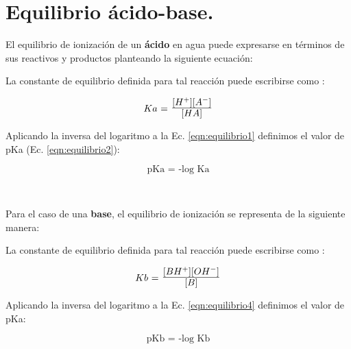 \documentclass[12pt,a4paper]{article}
\begin{document}
\section{Equilibrio ácido-base.}
	
	El equilibrio de ionización de un \textbf{ácido} en agua puede expresarse en términos de sus reactivos y productos planteando la siguiente ecuación:

	\begin{center}
	
		\setlength{\fboxsep}{10pt}

		\end{center}


	La constante de equilibrio definida para tal reacción puede escribirse como :
		
		\begin{equation}
			\mbox{$Ka$ = \Large $\frac{[H^+][A^-]}{[HA]}$}
			\label{eqn:equilibrio1}
		\end{equation}

	

	Aplicando la inversa del logaritmo a la Ec. \ref{eqn:equilibrio1} definimos el valor de pKa (Ec. \ref{eqn:equilibrio2}):

		\begin{equation}
			\mbox{pKa = -log Ka}
			\label{eqn:equilibrio2}
		\end{equation}
	
	~
		
	Para el caso de una \textbf{base}, el equilibrio de ionización se representa de la siguiente manera:
	
		\begin{center}

			\setlength{\fboxsep}{10pt}
			\label{eqn:equilibrio3}
		\end{center}
		
		
		La constante de equilibrio definida para tal reacción puede escribirse como :
		
		\begin{equation}
			\mbox{$Kb$ = \Large $\frac{[BH^+][OH^-]}{[B]}$}
			\label{eqn:equilibrio4}
		\end{equation}
		
		Aplicando la inversa del logaritmo a la Ec. \ref{eqn:equilibrio4} definimos el valor de pKa:
		
		\begin{equation}
			\mbox{pKb = -log Kb}
		\end{equation}
\end{document}
